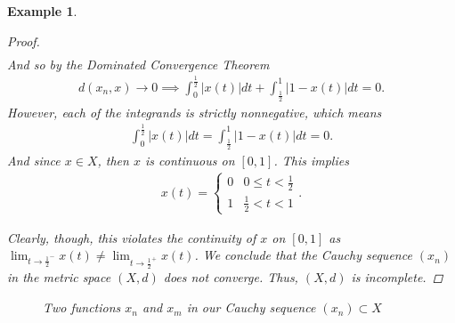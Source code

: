 \documentclass[11pt]{article}
\theoremstyle{mystyle}
\newtheorem{protoexamp}{Example}[section]
\newenvironment{examp}
{\colorlet{shadecolor}{orange!15}\begin{shaded}\begin{protoexamp}}
{\end{protoexamp}\end{shaded}}
\newcommand{\0}{\mathbf{0}}
\begin{document}
\begin{examp}
\begin{proof}
\begin{align*}
\end{align*}
And so by the Dominated Convergence Theorem
\begin{align*}
    d(x_n, x) \longrightarrow 0 \implies \int_0^{\frac{1}{2}}|x(t)| dt + \int_{\frac{1}{2}}^1|1-x(t)| dt = 0.
\end{align*}
However, each of the integrands is strictly nonnegative, which means
\begin{align*}
    \int_0^{\frac{1}{2}}|x(t)| dt = \int_{\frac{1}{2}}^1|1-x(t)| dt = 0.
\end{align*}
And since $x \in X$, then $x$ is continuous on $[0,1]$. This implies
\begin{align*}
    x(t) = \begin{cases}
    0 & 0 \leq t < \frac{1}{2}\\
    1 & \frac{1}{2}< t < 1
    \end{cases}.
\end{align*}

Clearly, though, this violates the continuity of $x$ on $[0, 1]$ as $\lim_{t \to \frac{1}{2}^-} x(t) \neq \lim_{t \to \frac{1}{2}^+} x(t)$. We conclude that the Cauchy sequence $(x_n)$ in the metric space $(X, d)$ does not converge. Thus, $(X, d)$ is incomplete.
\end{proof}

\begin{figure}[H]
\begin{center}
\end{center}
\caption*{Two functions $x_n$ and $x_m$ in our Cauchy sequence $(x_n) \subset X$}
\end{figure}
\end{examp}
\end{document}

